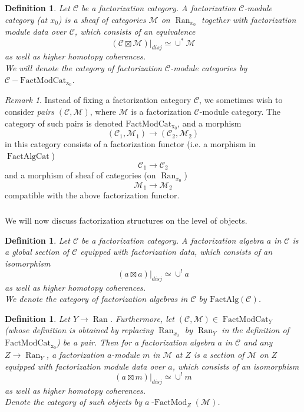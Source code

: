 \documentclass[10pt]{amsart}
\newtheorem{defn}[subsubsection]{Definition}
\theoremstyle{remark}
\newtheorem{rem}[subsubsection]{Remark}
\newcommand{\on}[1]{\operatorname{#1}}
\newcommand{\Ran}{\on{Ran}}
\newcommand{\FactAlgCat}{\on{FactAlgCat}}
\newcommand{\FactModCat}{\on{FactModCat_{x_0}}}
\newcommand{\sssec}[1]{\subsubsection{}}
\begin{document}
\begin{defn}
    Let $\mathcal{C}$ be a factorization category. A factorization $\mathcal{C}$-module category (at $x_0$) is a sheaf of categories $\mathcal{M}$ on $\Ran_{x_0}$ together with factorization module data over $\mathcal{C}$, which consists of an equivalence 
    $$
        (\mathcal{C} \boxtimes \mathcal{M})|_{disj} \simeq \cup^* \mathcal{M}
    $$
    as well as higher homotopy coherences.
    \\
    We will denote the category of factorization $\mathcal{C}$-module categories by $\mathcal{C}-\FactModCat$.
\end{defn}

\begin{rem}
    Instead of fixing a factorization category $\mathcal{C}$, we sometimes wish to consider \emph{pairs} $(\mathcal{C}, \mathcal{M})$, where $\mathcal{M}$ is a factorization $\mathcal{C}$-module category. The category of such pairs is denoted $\FactModCat$, and a morphism
    $$
    (\mathcal{C}_1, \mathcal{M}_1) \to (\mathcal{C}_2, \mathcal{M}_2)
    $$
    in this category consists of a factorization functor (i.e. a morphism in $\FactAlgCat$)
    $$
    \mathcal{C}_1 \to \mathcal{C}_2
    $$
    and a morphism of sheaf of categories (on $\Ran_{x_0}$)
    $$
    \mathcal{M}_1 \to \mathcal{M}_2
    $$
    compatible with the above factorization functor.
\end{rem}

\sssec{}
We will now discuss factorization structures on the level of objects.

\begin{defn}
    Let $\mathcal{C}$ be a factorization category. A factorization algebra $a$ in $\mathcal{C}$ is a global section of $\mathcal{C}$ equipped with factorization data, which consists of an isomorphism
    $$
    (a \boxtimes a)|_{disj} \simeq \cup^!a
    $$
    as well as higher homotopy coherences.
    \\
    We denote the category of factorization algebras in $\mathcal{C}$ by $\on{FactAlg(\mathcal{C})}$.
\end{defn}

\begin{defn}
    Let $Y \to \Ran$. Furthermore, let $(\mathcal{C}, \mathcal{M}) \in \on{FactModCat}_{Y}$ (whose definition is obtained by replacing $\Ran_{x_0}$ by $\Ran_{Y}$ in the definition of $\FactModCat$) be a pair. Then for a factorization algebra $a$ in $\mathcal{C}$ and any $Z \to \Ran_Y$, a factorization $a$-module $m$ in $\mathcal{M}$ at $Z$ is a section of $\mathcal{M}$ on $Z$ equipped with factorization module data over $a$, which consists of an isomorphism
    $$
    (a \boxtimes m)|_{disj} \simeq \cup^!m
    $$
    as well as higher homotopy coherences.
    \\
    Denote the category of such objects by $a\on{-FactMod}_{Z}(\mathcal{M})$.
\end{defn}
\end{document}
